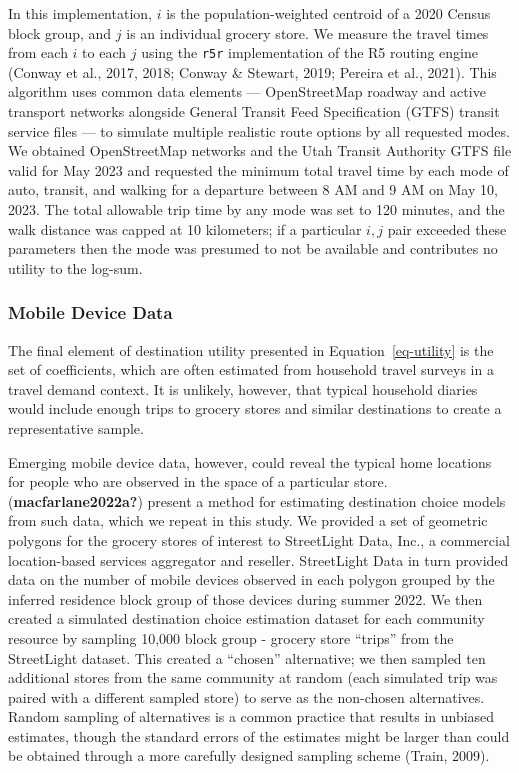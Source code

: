 \documentclass[
  letterpaper,
  number,
  review,
  3p]{elsarticle}
\begin{document}
In this implementation, \(i\) is the population-weighted centroid of a
2020 Census block group, and \(j\) is an individual grocery store. We
measure the travel times from each \(i\) to each \(j\) using the
\texttt{r5r} implementation of the R5 routing engine (Conway et al.,
2017, 2018; Conway \& Stewart, 2019; Pereira et al., 2021). This
algorithm uses common data elements --- OpenStreetMap roadway and active
transport networks alongside General Transit Feed Specification (GTFS)
transit service files --- to simulate multiple realistic route options
by all requested modes. We obtained OpenStreetMap networks and the Utah
Transit Authority GTFS file valid for May 2023 and requested the minimum
total travel time by each mode of auto, transit, and walking for a
departure between 8 AM and 9 AM on May 10, 2023. The total allowable
trip time by any mode was set to 120 minutes, and the walk distance was
capped at 10 kilometers; if a particular \(i,j\) pair exceeded these
parameters then the mode was presumed to not be available and
contributes no utility to the log-sum.

\subsubsection{Mobile Device Data}\label{mobile-device-data}

The final element of destination utility presented in
Equation~\ref{eq-utility} is the set of coefficients, which are often
estimated from household travel surveys in a travel demand context. It
is unlikely, however, that typical household diaries would include
enough trips to grocery stores and similar destinations to create a
representative sample.

Emerging mobile device data, however, could reveal the typical home
locations for people who are observed in the space of a particular
store. (\textbf{macfarlane2022a?}) present a method for estimating
destination choice models from such data, which we repeat in this study.
We provided a set of geometric polygons for the grocery stores of
interest to StreetLight Data, Inc., a commercial location-based services
aggregator and reseller. StreetLight Data in turn provided data on the
number of mobile devices observed in each polygon grouped by the
inferred residence block group of those devices during summer 2022. We
then created a simulated destination choice estimation dataset for each
community resource by sampling 10,000 block group - grocery store
``trips'' from the StreetLight dataset. This created a ``chosen''
alternative; we then sampled ten additional stores from the same
community at random (each simulated trip was paired with a different
sampled store) to serve as the non-chosen alternatives. Random sampling
of alternatives is a common practice that results in unbiased estimates,
though the standard errors of the estimates might be larger than could
be obtained through a more carefully designed sampling scheme (Train,
2009).
\end{document}
